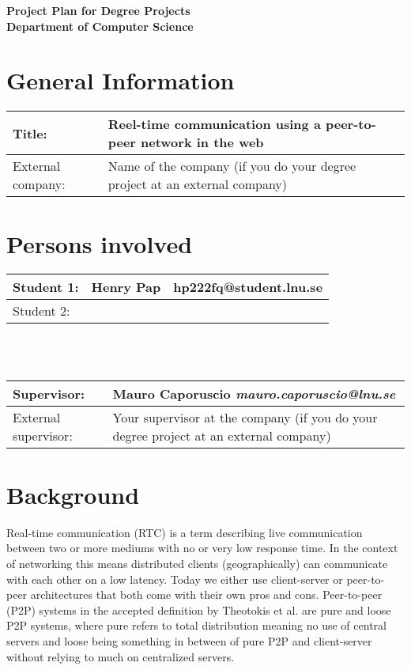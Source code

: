 \documentclass[12pt]{article}
\begin{document}
\begin{center}
\Large \textbf{Project Plan for Degree Projects} \\
\large \textbf{Department of Computer Science}
\end{center}

\section*{General Information}
\begin{tabular} {|p{3.8cm}|p{9cm}|} \hline
Title: & Reel-time communication using a peer-to-peer network in the web \\ \hline
External company: & Name of the company (if you do your degree project at an external company) \\ \hline
\end{tabular}

\section*{Persons involved}
\begin{tabular} {|p{2.2cm}|p{4.7cm}|p{5.47cm}|} \hline
Student 1: & Henry Pap & hp222fq@student.lnu.se \\ \hline
Student 2: &  &  \\ \hline
\end{tabular}
\\ \vspace*{0.2cm} \\
\begin{tabular} {|p{3.9cm}|p{8.9cm}|} \hline
Supervisor: & Mauro Caporuscio \textit{mauro.caporuscio@lnu.se} \\ \hline
External supervisor: & Your supervisor at the company (if you do your degree project at an external company) \\ \hline
\end{tabular}

\pagebreak

\section*{Background}
Real-time communication (RTC) \cite{Techopedia:RTCdefinition} is a term describing live communication between two or more mediums
with no or very low response time. In the context of networking this means distributed clients (geographically) 
can communicate with each other on a low latency. Today we either use client-server or peer-to-peer architectures
that both come with their own pros and cons. 
Peer-to-peer (P2P) systems in the accepted definition by Theotokis et al. \cite{Androutsellis-Theotokis:2004:SPC:1041680.1041681} are pure and loose P2P systems, where pure refers to total
distribution meaning no use of central servers and loose being something in between of pure P2P and client-server 
without relying to much on centralized servers. 
\end{document}
